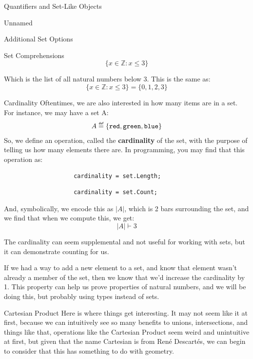 \begin{part}{Quantifiers and Set-Like Objects}
\begin{chapter}{Unnamed}
\begin{section}{Additional Set Options}
\begin{subsection}{Set Comprehensions}
                $$
                    \{ x \in \mathbb{Z} : x \leq 3 \}
                $$
                
                Which is the list of all natural numbers below 3. This is the same as:
                $$
                    \{ x \in \mathbb{Z} : x \leq 3 \} = \{0, 1, 2, 3\}
                $$
            \end{subsection}
        
            \begin{subsection}{Cardinality}
                Oftentimes, we are also interested in how many items are in a set. For instance, we may have a set A:
                $$
                    A \defeq \{\texttt{red}, \texttt{green}, \texttt{blue}\}
                $$
                So, we define an operation, called the \textbf{cardinality} of the set, with the purpose of telling us how many elements there are. In programming, you may find that this operation as:
                
                \begin{verbatim}
                    cardinality = set.Length;
                \end{verbatim}
                \begin{verbatim}
                    cardinality = set.Count;
                \end{verbatim}
                
                And, symbolically, we encode this as $|A|$, which is 2 bars surrounding the set, and we find that when we compute this, we get:
                $$
                    |A| \vdash 3
                $$
                
                The cardinality can seem supplemental and not useful for working with sets, but it can demonstrate counting for us.
                
                If we had a way to add a new element to a set, and know that element wasn't already a member of the set, then we know that we'd increase the cardinality by 1. This property can help us prove properties of natural numbers, and we will be doing this, but probably using types instead of sets.
            \end{subsection}
            \begin{subsection}{Cartesian Product}
                Here is where things get interesting. It may not seem like it at first, because we can intuitively see so many benefits to unions, intersections, and things like that, operations like the Cartesian Product seem weird and unintuitive at first, but given that the name Cartesian is from René Descartés, we can begin to consider that this has something to do with geometry.
                

\end{subsection}
\end{section}
\end{chapter}
\end{part}

